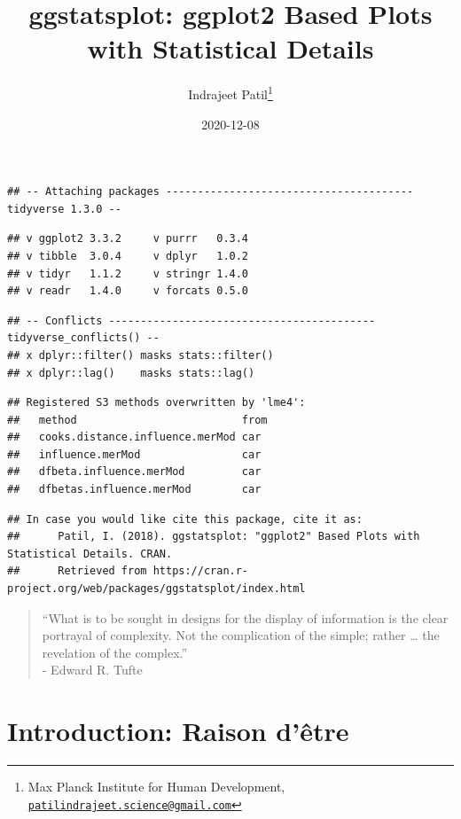 \documentclass[
]{article}
\title{ggstatsplot: ggplot2 Based Plots with Statistical Details}
\author{Indrajeet Patil\footnote{Max Planck Institute for Human Development, \href{mailto:patilindrajeet.science@gmail.com}{\nolinkurl{patilindrajeet.science@gmail.com}}}}
\date{2020-12-08}
\begin{document}
\maketitle

{
\hypersetup{linkcolor=}
\setcounter{tocdepth}{2}
\tableofcontents
}
\begin{verbatim}
## -- Attaching packages --------------------------------------- tidyverse 1.3.0 --
\end{verbatim}

\begin{verbatim}
## v ggplot2 3.3.2     v purrr   0.3.4
## v tibble  3.0.4     v dplyr   1.0.2
## v tidyr   1.1.2     v stringr 1.4.0
## v readr   1.4.0     v forcats 0.5.0
\end{verbatim}

\begin{verbatim}
## -- Conflicts ------------------------------------------ tidyverse_conflicts() --
## x dplyr::filter() masks stats::filter()
## x dplyr::lag()    masks stats::lag()
\end{verbatim}

\begin{verbatim}
## Registered S3 methods overwritten by 'lme4':
##   method                          from
##   cooks.distance.influence.merMod car 
##   influence.merMod                car 
##   dfbeta.influence.merMod         car 
##   dfbetas.influence.merMod        car
\end{verbatim}

\begin{verbatim}
## In case you would like cite this package, cite it as:
##      Patil, I. (2018). ggstatsplot: "ggplot2" Based Plots with Statistical Details. CRAN.
##      Retrieved from https://cran.r-project.org/web/packages/ggstatsplot/index.html
\end{verbatim}

\begin{quote}
``What is to be sought in designs for the display of information is the clear
portrayal of complexity. Not the complication of the simple; rather \ldots{} the
revelation of the complex.''\\
- Edward R. Tufte
\end{quote}

\hypertarget{introduction-raison-duxeatre}{%
\section{Introduction: Raison d'être}\label{introduction-raison-duxeatre}}
\end{document}
